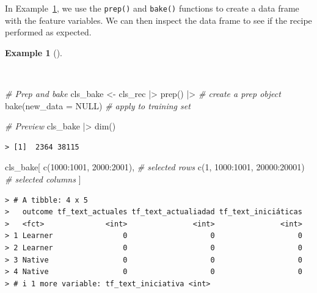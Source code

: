 \documentclass[
  letterpaper,
  DIV=11,
  numbers=noendperiod]{scrreprt}
\newenvironment{Shaded}{\begin{snugshade}}{\end{snugshade}}
\newcommand{\AttributeTok}[1]{\textcolor[rgb]{0.00,0.00,0.00}{#1}}
\newcommand{\CommentTok}[1]{\textcolor[rgb]{0.00,0.00,0.00}{\textit{#1}}}
\newcommand{\ConstantTok}[1]{\textcolor[rgb]{0.00,0.00,0.00}{#1}}
\newcommand{\DecValTok}[1]{\textcolor[rgb]{0.00,0.00,0.00}{#1}}
\newcommand{\FunctionTok}[1]{\textcolor[rgb]{0.00,0.00,0.00}{#1}}
\newcommand{\NormalTok}[1]{\textcolor[rgb]{0.00,0.00,0.00}{#1}}
\newcommand{\OtherTok}[1]{\textcolor[rgb]{0.00,0.00,0.00}{#1}}
\newcommand{\SpecialCharTok}[1]{\textcolor[rgb]{0.00,0.00,0.00}{#1}}
\theoremstyle{definition}
\newtheorem{example}{Example}[chapter]
\theoremstyle{remark}
\begin{document}
In Example~\ref{exm-pda-class-recipe-prep}, we use the \texttt{prep()}
and \texttt{bake()} functions to create a data frame with the feature
variables. We can then inspect the data frame to see if the recipe
performed as expected.

\begin{example}[]\protect\hypertarget{exm-pda-class-recipe-prep}{}\label{exm-pda-class-recipe-prep}

~

\begin{Shaded}
\begin{Highlighting}[]
\CommentTok{\# Prep and bake}
\NormalTok{cls\_bake }\OtherTok{\textless{}{-}}
\NormalTok{  cls\_rec }\SpecialCharTok{|\textgreater{}}
  \FunctionTok{prep}\NormalTok{() }\SpecialCharTok{|\textgreater{}} \CommentTok{\# create a prep object}
  \FunctionTok{bake}\NormalTok{(}\AttributeTok{new\_data =} \ConstantTok{NULL}\NormalTok{) }\CommentTok{\# apply to training set}

\CommentTok{\# Preview}
\NormalTok{cls\_bake }\SpecialCharTok{|\textgreater{}} \FunctionTok{dim}\NormalTok{()}
\end{Highlighting}
\end{Shaded}

\begin{verbatim}
> [1]  2364 38115
\end{verbatim}

\begin{Shaded}
\begin{Highlighting}[]
\NormalTok{cls\_bake[}
  \FunctionTok{c}\NormalTok{(}\DecValTok{1000}\SpecialCharTok{:}\DecValTok{1001}\NormalTok{, }\DecValTok{2000}\SpecialCharTok{:}\DecValTok{2001}\NormalTok{),     }\CommentTok{\# selected rows}
  \FunctionTok{c}\NormalTok{(}\DecValTok{1}\NormalTok{, }\DecValTok{1000}\SpecialCharTok{:}\DecValTok{1001}\NormalTok{, }\DecValTok{20000}\SpecialCharTok{:}\DecValTok{20001}\NormalTok{) }\CommentTok{\# selected columns}
\NormalTok{  ]}
\end{Highlighting}
\end{Shaded}

\begin{verbatim}
> # A tibble: 4 x 5
>   outcome tf_text_actuales tf_text_actualiadad tf_text_iniciáticas
>   <fct>              <int>               <int>               <int>
> 1 Learner                0                   0                   0
> 2 Learner                0                   0                   0
> 3 Native                 0                   0                   0
> 4 Native                 0                   0                   0
> # i 1 more variable: tf_text_iniciativa <int>
\end{verbatim}

\end{example}
\end{document}
